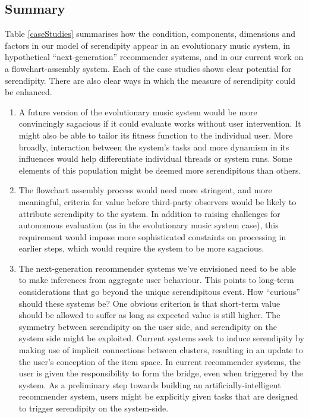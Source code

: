 \subsection{Summary}

Table \ref{caseStudies} summarises how the condition, components,
dimensions and factors in our model of serendipity appear in an
evolutionary music system, in hypothetical ``next-generation''
recommender systems, and in our current work on a flowchart-assembly
system.  Each of the case studies shows clear potential for
serendipity.  There are also clear ways in which the measure of
serendipity could be enhanced.

\begin{enumerate}
\item A future version of the evolutionary music system would be more
  convincingly sagacious if it could evaluate works without user
  intervention.  It might also be able to tailor its fitness function
  to the individual user.  More broadly, interaction between the
  system's tasks and more dynamism in its influences would help
  differentiate individual threads or system runs.  Some elements of
  this population might be deemed more serendipitous than others.

\item  The flowchart assembly process would need more stringent, and
  more meaningful, criteria for value before third-party observers
  would be likely to attribute serendipity to the system.  In addition
  to raising challenges for autonomous evaluation (as in the
  evolutionary music system case), this requirement would impose more
  sophisticated constaints on processing in earlier steps, which would
  require the system to be more sagacious.

\item  The next-generation recommender systems we've envisioned need to
  be able to make inferences from aggregate user behaviour.  This
  points to long-term considerations that go beyond the unique
  serendipitous event.  How ``curious'' should these systems be?  One
  obvious criterion is that short-term value should be allowed to
  suffer as long as expected value is still higher.  The symmetry
  between serendipity on the user side, and serendipity on the system
  side might be exploited.  Current systems seek to induce serendipity
  by making use of implicit connections between clusters, resulting in
  an update to the user's conception of the item space.  In current
  recommender systems, the user is given the responsibility to form
  the bridge, even when triggered by the system.  As a preliminary
  step towards building an artificially-intelligent recommender
  system, users might be explicitly given tasks that are designed to
  trigger serendipity on the system-side.
\end{enumerate}

